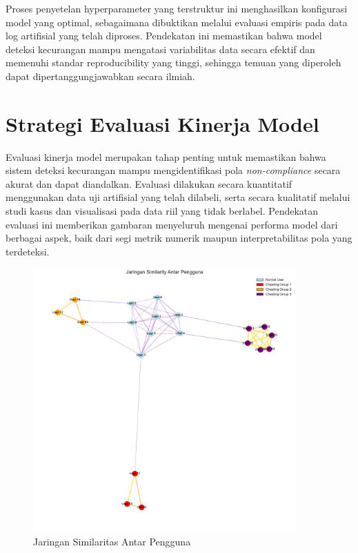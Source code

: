 Proses penyetelan hyperparameter yang terstruktur ini menghasilkan konfigurasi model yang optimal, sebagaimana dibuktikan melalui evaluasi empiris pada data log artifisial yang telah diproses. Pendekatan ini memastikan bahwa model deteksi kecurangan mampu mengatasi variabilitas data secara efektif dan memenuhi standar reproducibility yang tinggi, sehingga temuan yang diperoleh dapat dipertanggungjawabkan secara ilmiah.

\section{Strategi Evaluasi Kinerja Model}
\label{sec:strategiEvaluasiKinerjaModel}
Evaluasi kinerja model merupakan tahap penting untuk memastikan bahwa sistem deteksi kecurangan mampu mengidentifikasi pola \textit{non-compliance} secara akurat dan dapat diandalkan. Evaluasi dilakukan secara kuantitatif menggunakan data uji artifisial yang telah dilabeli, serta secara kualitatif melalui studi kasus dan visualisasi pada data riil yang tidak berlabel. Pendekatan evaluasi ini memberikan gambaran menyeluruh mengenai performa model dari berbagai aspek, baik dari segi metrik numerik maupun interpretabilitas pola yang terdeteksi.

\begin{figure}[htbp]
    \centering
    \includegraphics[width=0.9\textwidth]{figures/similarity_network.pdf}
    \caption{Jaringan Similaritas Antar Pengguna}
    \label{fig:similarity_network}
\end{figure}

